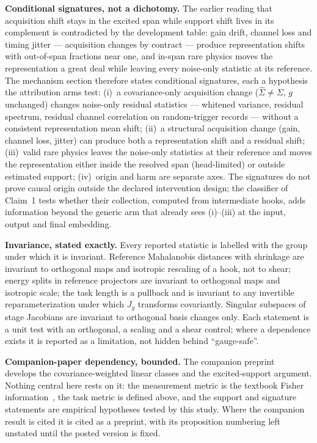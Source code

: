 \documentclass[10pt,twocolumn]{extarticle}
\begin{document}
\textbf{Conditional signatures, not a dichotomy.} The earlier reading that
acquisition shift stays in the excited span while support shift lives in its
complement is contradicted by the development table: gain drift, channel loss
and timing jitter --- acquisition changes by contract --- produce
representation shifts with out-of-span fractions near one, and in-span rare
physics moves the representation a great deal while leaving every
noise-only statistic at its reference. The mechanism section therefore states
conditional signatures, each a hypothesis the attribution arms test:
(i)~a covariance-only acquisition change ($\hat\Sigma\neq\Sigma$, $g$
unchanged) changes noise-only residual statistics --- whitened variance,
residual spectrum, residual channel correlation on random-trigger records ---
without a consistent representation mean shift; (ii)~a structural acquisition
change (gain, channel loss, jitter) can produce both a representation shift
and a residual shift; (iii)~valid rare physics leaves the noise-only
statistics at their reference and moves the representation either inside the
resolved span (head-limited) or outside estimated support; (iv)~origin and
harm are separate axes. The signatures do not prove causal origin outside the
declared intervention design; the classifier of Claim~1 tests whether their
collection, computed from intermediate hooks, adds information beyond the
generic arm that already sees (i)--(iii) at the input, output and final
embedding.

\textbf{Invariance, stated exactly.} Every reported statistic is labelled with
the group under which it is invariant. Reference Mahalanobis distances with
shrinkage are invariant to orthogonal maps and isotropic rescaling of a hook,
not to shear; energy splits in reference projectors are invariant to
orthogonal maps and isotropic scale; the task length is a pullback and is
invariant to any invertible reparameterization under which $J_y$ transforms
covariantly. Singular subspaces of stage Jacobians are invariant to orthogonal
basis changes only. Each statement is a unit test with an orthogonal, a
scaling and a shear control; where a dependence exists it is reported as a
limitation, not hidden behind ``gauge-safe''.

\textbf{Companion-paper dependency, bounded.} The companion
preprint~\cite{paper1} develops the covariance-weighted linear classes and
the excited-support argument. Nothing central here rests on it: the
measurement metric is the textbook Fisher information~\cite{kay1993}, the
task metric is defined above, and the support and signature statements are
empirical hypotheses tested by this study. Where the companion result is
cited it is cited as a preprint, with its proposition numbering left
unstated until the posted version is fixed.
\end{document}

